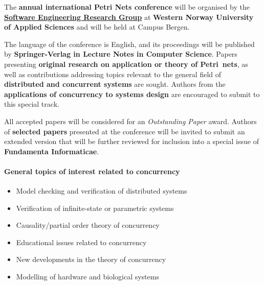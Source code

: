 \documentclass[10pt]{article}
\begin{document}
\bigskip
\noindent
The {\bf{} annual international Petri Nets conference} will be organised by the {\bf \href{https://www.hvl.no/en/research/group/software-engineering/}{Software Engineering Research Group}} at {\bf Western Norway University of Applied Sciences} and will be held at Campus Bergen.

%
\smallskip
\noindent
The language of the conference is English, and its proceedings will be published by
{\bf Springer-Verlag in Lecture Notes in Computer Science}.
Papers presenting {\bf original research on application or theory of Petri nets}, as well
as contributions addressing topics relevant to the general field of {\bf distributed and
concurrent systems} are sought. Authors from the {\bf applications of concurrency
to systems
design} are encouraged to submit to this special track.

\smallskip
\noindent
All accepted papers will be considered for an \textit{Outstanding
Paper} award. Authors of {\bf selected papers} presented at the conference will be invited
to submit an extended version that will be further reviewed for inclusion into a special
issue of {\bf Fundamenta Informaticae}.

\paragraph*{General topics of interest related to concurrency}

\vspace*{-0.3cm}
\begin{itemize}
\item Model checking and verification of distributed systems
\item Verification of infinite-state or parametric systems
\item Causality/partial order theory of concurrency
\item Educational issues related to concurrency
\item New developments in the theory of concurrency
\item Modelling of hardware and biological systems
\end{itemize}




\end{document}
